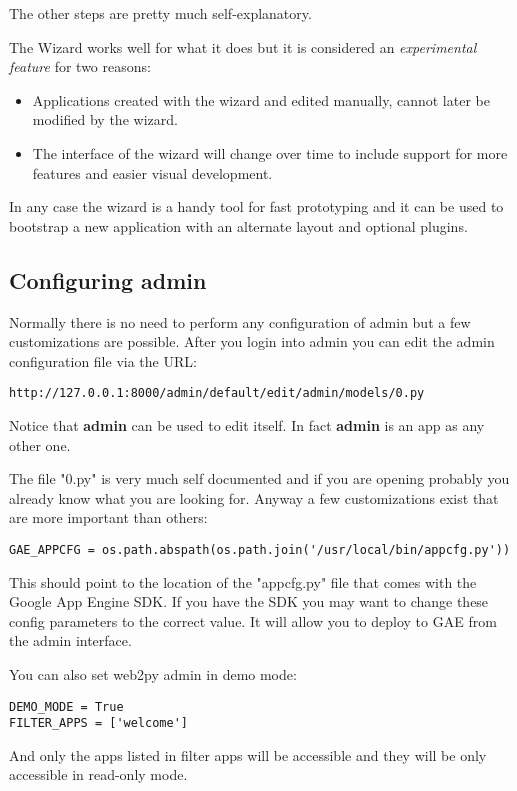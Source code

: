 \documentclass[justified,sixbynine,notoc]{tufte-book}
\def\inxx#1{\index{#1}}
\begin{document}
\begin{fullwidth}
The other steps are pretty much self-explanatory.

The Wizard works well for what it does but it is considered an {\it experimental feature} for two reasons:

\begin{itemize}
\item Applications created with the wizard and edited manually, cannot later be modified by the wizard.

\item The interface of the wizard will change over time to include support for more features and easier visual development.
\end{itemize}

In any case the wizard is a handy tool for fast prototyping and it can be used to bootstrap a new application with an alternate layout and optional plugins.

\goodbreak\subsection{Configuring {\bf admin}}

Normally there is no need to perform any configuration of admin but a few customizations are possible. After you login into admin you can edit the admin configuration file via the URL:
\begin{lstlisting}[keywords={}]
http://127.0.0.1:8000/admin/default/edit/admin/models/0.py
\end{lstlisting}
Notice that {\bf admin} can be used to edit itself. In fact {\bf admin} is an app as any other one.

The file "0.py" is very much self documented and if you are opening probably you already know what you are looking for. Anyway a few customizations exist that are more important than others:

\begin{lstlisting}
GAE_APPCFG = os.path.abspath(os.path.join('/usr/local/bin/appcfg.py'))
\end{lstlisting}
This should point to the location of the "appcfg.py" file that comes with the Google App Engine SDK. If you have the SDK you may want to change these config parameters to the correct value. It will allow you to deploy to GAE from the admin interface.

\inxx{DEMO\_MODE}

You can also set web2py admin in demo mode:
\begin{lstlisting}
DEMO_MODE = True
FILTER_APPS = ['welcome']
\end{lstlisting}
And only the apps listed in filter apps will be accessible and they will be only accessible in read-only mode.


\end{fullwidth}
\end{document}

